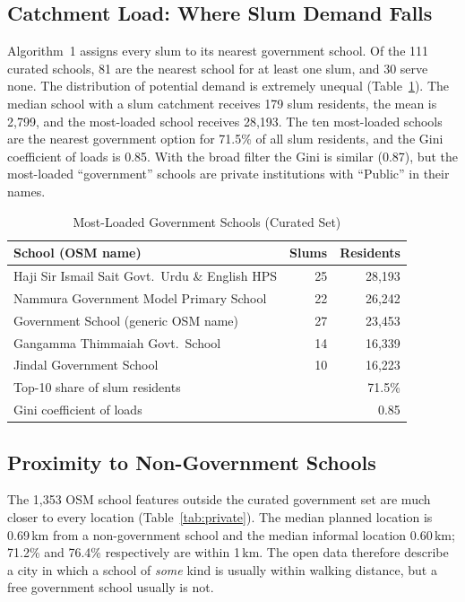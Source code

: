 \documentclass[conference]{IEEEtran}
\newcommand{\km}{\,km}
\begin{document}
\subsection{Catchment Load: Where Slum Demand Falls}
Algorithm~1 assigns every slum to its nearest government school. Of the 111 curated schools, 81 are the nearest school for at least one slum, and 30 serve none. The distribution of potential demand is extremely unequal (Table~\ref{tab:load}). The median school with a slum catchment receives 179 slum residents, the mean is 2,799, and the most-loaded school receives 28,193. The ten most-loaded schools are the nearest government option for 71.5\% of all slum residents, and the Gini coefficient of loads is 0.85. With the broad filter the Gini is similar (0.87), but the most-loaded ``government'' schools are private institutions with ``Public'' in their names.

\begin{table}[!t]
\centering
\caption{Most-Loaded Government Schools (Curated Set)}
\label{tab:load}
\footnotesize
\begin{tabularx}{\columnwidth}{@{}Xrr@{}}
\toprule
\textbf{School (OSM name)} & \textbf{Slums} & \textbf{Residents} \\
\midrule
Haji Sir Ismail Sait Govt.\ Urdu \& English HPS & 25 & 28,193 \\
Nammura Government Model Primary School & 22 & 26,242 \\
Government School (generic OSM name) & 27 & 23,453 \\
Gangamma Thimmaiah Govt.\ School & 14 & 16,339 \\
Jindal Government School & 10 & 16,223 \\
\midrule
Top-10 share of slum residents & \multicolumn{2}{r}{71.5\%} \\
Gini coefficient of loads & \multicolumn{2}{r}{0.85} \\
\bottomrule
\end{tabularx}
\end{table}

\subsection{Proximity to Non-Government Schools}
The 1,353 OSM school features outside the curated government set are much closer to every location (Table~\ref{tab:private}). The median planned location is 0.69\km{} from a non-government school and the median informal location 0.60\km{}; 71.2\% and 76.4\% respectively are within 1\km{}. The open data therefore describe a city in which a school of \emph{some} kind is usually within walking distance, but a free government school usually is not.
\end{document}
